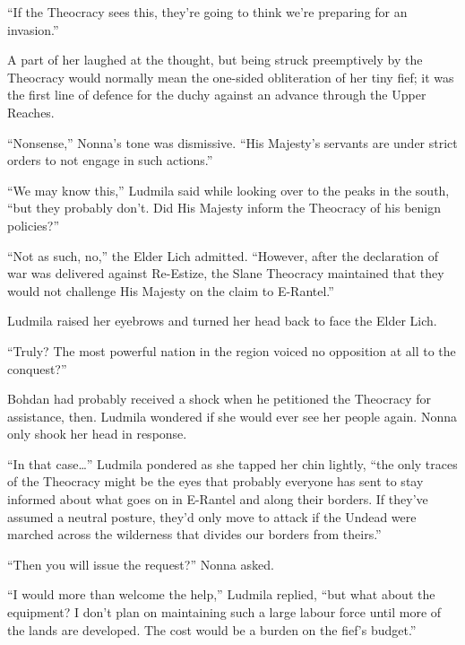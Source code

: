 “If the Theocracy sees this, they’re going to think we’re preparing for an invasion.”

 

A part of her laughed at the thought, but being struck preemptively by the Theocracy would normally mean the one-sided obliteration of her tiny fief; it was the first line of defence for the duchy against an advance through the Upper Reaches.

 

“Nonsense,” Nonna’s tone was dismissive. “His Majesty’s servants are under strict orders to not engage in such actions.”

 

“We may know this,” Ludmila said while looking over to the peaks in the south, “but they probably don’t. Did His Majesty inform the Theocracy of his benign policies?”

 

“Not as such, no,” the Elder Lich admitted. “However, after the declaration of war was delivered against Re-Estize, the Slane Theocracy maintained that they would not challenge His Majesty on the claim to E-Rantel.”

 

Ludmila raised her eyebrows and turned her head back to face the Elder Lich.

 

“Truly? The most powerful nation in the region voiced no opposition at all to the conquest?”

 

Bohdan had probably received a shock when he petitioned the Theocracy for assistance, then. Ludmila wondered if she would ever see her people again. Nonna only shook her head in response.

 

“In that case…” Ludmila pondered as she tapped her chin lightly, “the only traces of the Theocracy might be the eyes that probably everyone has sent to stay informed about what goes on in E-Rantel and along their borders. If they’ve assumed a neutral posture, they’d only move to attack if the Undead were marched across the wilderness that divides our borders from theirs.”

 

“Then you will issue the request?” Nonna asked.

 

“I would more than welcome the help,” Ludmila replied, “but what about the equipment? I don’t plan on maintaining such a large labour force until more of the lands are developed. The cost would be a burden on the fief’s budget.”


